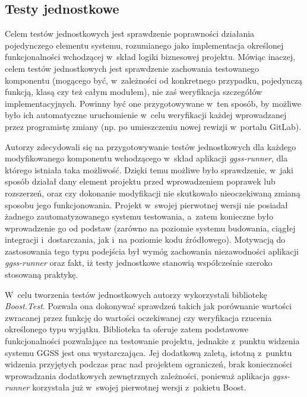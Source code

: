 \subsection{Testy jednostkowe}
Celem testów jednostkowych jest sprawdzenie poprawności działania pojedynczego elementu systemu, rozumianego jako implementacja określonej funkcjonalności wchodzącej w~skład logiki biznesowej projektu. Mówiąc inaczej, celem testów jednostkowych jest sprawdzenie zachowania testowanego komponentu (mogącego być, w~zależności od konkretnego przypadku, pojedynczą funkcją, klasą czy też całym modułem), nie zaś weryfikacja szczegółów implementacyjnych. Powinny być one przygotowywane w~ten sposób, by możliwe było ich automatyczne uruchomienie w~celu weryfikacji każdej wprowadzanej przez programistę zmiany (np. po umieszczeniu nowej rewizji w~portalu GitLab). 

Autorzy zdecydowali się na przygotowywanie testów jednostkowych dla każdego modyfikowanego komponentu wchodzącego w~skład aplikacji \emph{ggss-runner}, dla którego istniała taka możliwość. Dzięki temu możliwe było sprawdzenie, w~jaki sposób działał dany element projektu przed wprowadzeniem poprawek lub rozszerzeń, oraz czy dokonanie modyfikacji nie skutkowało nieoczekiwaną zmianą sposobu jego funkcjonowania. Projekt w~swojej pierwotnej wersji nie posiadał żadnego zautomatyzowanego systemu testowania, a~zatem konieczne było wprowadzenie go od podstaw (zarówno na poziomie systemu budowania, ciągłej integracji i~dostarczania, jak i~na poziomie kodu źródłowego). Motywacją do zastosowania tego typu podejścia był wymóg zachowania niezawodności aplikacji \emph{ggss-runner} oraz fakt, iż testy jednostkowe stanowią współcześnie szeroko stosowaną praktykę. 

W~celu tworzenia testów jednostkowych autorzy wykorzystali bibliotekę \emph{Boost.Test}. Pozwala ona dokonywać sprawdzeń takich jak porównanie wartości zwracanej przez funkcję do wartości oczekiwanej czy weryfikacja rzucenia określonego typu wyjątku. Biblioteka ta oferuje zatem podstawowe funkcjonalności pozwalające na testowanie projektu, jednakże z~punktu widzenia systemu GGSS jest ona wystarczająca. Jej dodatkową zaletą, istotną z~punktu widzenia przyjętych podczas prac nad projektem ograniczeń, brak konieczności wprowadzania dodatkowych zewnętrznych zależności, ponieważ aplikacja \emph{ggss-runner} korzystała już w~swojej pierwotnej wersji z~pakietu Boost.

